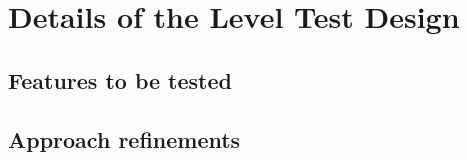 \chapter{Details of the Level Test Design} \label{chp:details-of-the-level-test-design}
	\begin{comment}
		Introduce the following subordinate sections. This section describes the features to be tested and any
		refinements to the test approach as required for the level. It also identifies the sets of test cases (highest
		level test cases) or scenarios along with the pass/fail criteria. It may also include the test deliverables.
	\end{comment}
	
\section{Features to be tested} \label{s:details-of-the-level-test-design:features-to-be-tested}
	\begin{comment}
		Identify the test items and describe the features and combinations of features that are the object of this
		LTD. Other features that may be exercised but that are not the specific object of this LTD need not be
		identified (e.g., a database management system that is supporting the reports that are being tested). The
		LTD provides more detailed information than the Level Test Plan. For example, identify an overall test
		architecture of all test scenarios, the individual scenarios, and the detailed test objectives within each
		scenario.
		For each feature or feature combination, a reference to its associated requirements in the item
		requirement and/or design description may be included. This may be documented in a Test
		Traceability Matrix (LTP Section 2.2).
	\end{comment}

\section{Approach refinements} \label{s:details-of-the-level-test-design:approach-refinements}
	\begin{comment}
		Specify refinements to the approach described in the corresponding Level Test Plan (if there is one;
		otherwise specify the entire approach). Include specific test techniques to be used. The method of
		analyzing test results should be identified (e.g., comparator tools, visual inspection, etc.).
		Summarize the common attributes of any test cases. This may include input constraints that must be
		true for every input in a set of associated test cases, any shared environmental needs, any shared
		special procedural requirements, and any shared case dependencies. Sets of associated test cases may
		be identified as scenarios (also commonly called scripts or suites). Test scenarios should be designed to
		be as reusable as possible for regression testing, revalidation testing for changes, and training new
		employees who must either use or support the system over time.
	\end{comment}

